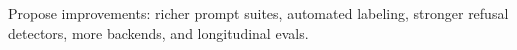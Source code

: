 Propose improvements: richer prompt suites, automated labeling, stronger refusal detectors, more backends, and longitudinal evals.
